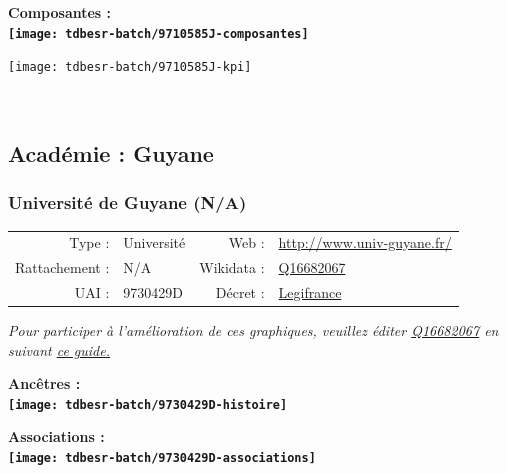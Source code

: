\documentclass[12pt,french,]{article}
\begin{document}
\hrulefill

\begin{center} \bf Composantes : \\  
\texttt{[image: tdbesr-batch/9710585J-composantes]} \end{center}

\begin{center}\texttt{[image: tdbesr-batch/9710585J-kpi]} \end{center}\checkoddpage

\ifoddpage \fi ~\newpage  

\hypertarget{acaduxe9mie-guyane}{%
\subsection{Académie : Guyane}\label{acaduxe9mie-guyane}}

\hypertarget{universituxe9-de-guyane-na}{%
\subsubsection{Université de Guyane
(N/A)}\label{universituxe9-de-guyane-na}}

\begin{tabular*}{\textwidth}{rp{5cm}rl}  
\hline  
Type : & Université & Web : &\href{http://www.univ-guyane.fr/}{http://www.univ-guyane.fr/} \\  
Rattachement : & N/A & Wikidata : & \href{https://www.wikidata.org/entity/Q16682067}{Q16682067} \\  
UAI : & 9730429D & Décret : & \href{http://www.legifrance.gouv.fr/affichTexte.do;jsessionid=?cidTexte=JORFTEXT000029310823&dateTexte=&oldAction=dernierJO&categorieLien=id}{Legifrance} \\  
\hline  
\end{tabular*}

\textit{\scriptsize Pour participer à l'amélioration de ces graphiques, veuillez éditer  \href{https://www.wikidata.org/entity/Q16682067}{Q16682067}  en suivant \href{https://github.com/cpesr/wikidataESR/blob/master/Rmd/wikidataESR.md}{ce guide.}}

\vspace{1cm}  
\begin{minipage}[b]{0.50\textwidth}\begin{center} \bf Ancêtres : \\  
\texttt{[image: tdbesr-batch/9730429D-histoire]} \end{center}\end{minipage}\begin{minipage}[b]{0.50\textwidth}\begin{center} \bf Associations : \\  
\texttt{[image: tdbesr-batch/9730429D-associations]} \end{center}\end{minipage}
\end{document}
